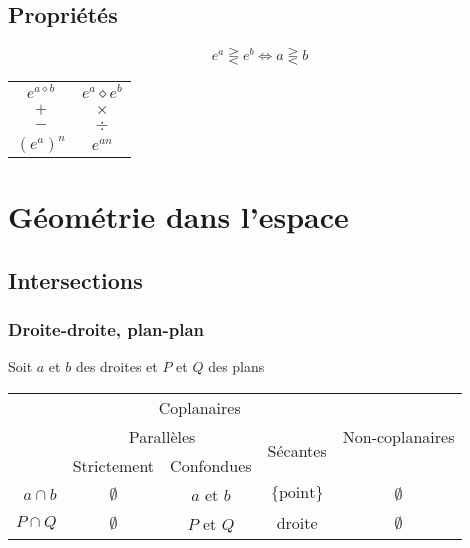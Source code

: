 \documentclass{article}
\newcommand{\placeholder}{\diamond}
\begin{document}
\label{proprietes_exp}
\subsection{Propriétés}

\[e^a \gtreqless e^b \iff a \gtreqless b\]

\begin{table}[h!]
    \centering
    \begin{tabular}{c|c}
        $e^{a\placeholder b}$ & $e^ a \placeholder e^ b $ \\
        $+$ & $\times$ \\
        $-$ & $\div$ \\\hline
        $(e^a)^n$ &  $e^{an}$ \\
    \end{tabular}
\end{table}

\newpage
\section{Géométrie dans l'espace}

\subsection{Intersections}
\subsubsection{Droite-droite, plan-plan}

\begin{center}
    Soit $a$ et $b$ des droites et $P$ et $Q$ des plans
\end{center}

\begin{table}[h]
    \centering
\begin{tabular}{r|c|c|c|c}
           & \multicolumn{3}{c|}{Coplanaires}                                   & \multirow{3}{*}{Non-coplanaires} \\ \cline{2-4}
           & \multicolumn{2}{c|}{Parallèles}        & \multirow{2}{*}{Sécantes} &                                  \\ \cline{2-3}
           & Strictement  & Confondues    &                           &                                  \\ \hline\hline
$a \cap b$ & $\emptyset$  & $a$ et $b$    & $ \{ \text{point} \}$     & $ \emptyset$                     \\
$P \cap Q$ & $\emptyset$  & $P$ et $Q$    & $  \text{droite} $        & $  \emptyset$                   
\end{tabular}
\end{table}
\end{document}
